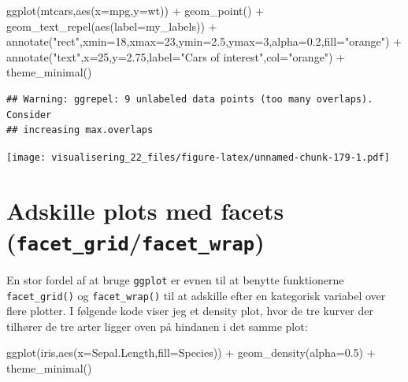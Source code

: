\documentclass[
]{book}
\newenvironment{Shaded}{\begin{snugshade}}{\end{snugshade}}
\newcommand{\AttributeTok}[1]{\textcolor[rgb]{0.77,0.63,0.00}{#1}}
\newcommand{\DecValTok}[1]{\textcolor[rgb]{0.00,0.00,0.81}{#1}}
\newcommand{\FloatTok}[1]{\textcolor[rgb]{0.00,0.00,0.81}{#1}}
\newcommand{\FunctionTok}[1]{\textcolor[rgb]{0.00,0.00,0.00}{#1}}
\newcommand{\NormalTok}[1]{#1}
\newcommand{\SpecialCharTok}[1]{\textcolor[rgb]{0.00,0.00,0.00}{#1}}
\newcommand{\StringTok}[1]{\textcolor[rgb]{0.31,0.60,0.02}{#1}}
\begin{document}
\begin{Shaded}
\begin{Highlighting}[]
\FunctionTok{ggplot}\NormalTok{(mtcars,}\FunctionTok{aes}\NormalTok{(}\AttributeTok{x=}\NormalTok{mpg,}\AttributeTok{y=}\NormalTok{wt)) }\SpecialCharTok{+} 
  \FunctionTok{geom\_point}\NormalTok{() }\SpecialCharTok{+}
  \FunctionTok{geom\_text\_repel}\NormalTok{(}\FunctionTok{aes}\NormalTok{(}\AttributeTok{label=}\NormalTok{my\_labels)) }\SpecialCharTok{+}
  \FunctionTok{annotate}\NormalTok{(}\StringTok{"rect"}\NormalTok{,}\AttributeTok{xmin=}\DecValTok{18}\NormalTok{,}\AttributeTok{xmax=}\DecValTok{23}\NormalTok{,}\AttributeTok{ymin=}\FloatTok{2.5}\NormalTok{,}\AttributeTok{ymax=}\DecValTok{3}\NormalTok{,}\AttributeTok{alpha=}\FloatTok{0.2}\NormalTok{,}\AttributeTok{fill=}\StringTok{"orange"}\NormalTok{) }\SpecialCharTok{+}
  \FunctionTok{annotate}\NormalTok{(}\StringTok{"text"}\NormalTok{,}\AttributeTok{x=}\DecValTok{25}\NormalTok{,}\AttributeTok{y=}\FloatTok{2.75}\NormalTok{,}\AttributeTok{label=}\StringTok{"Cars of interest"}\NormalTok{,}\AttributeTok{col=}\StringTok{"orange"}\NormalTok{) }\SpecialCharTok{+} 
  \FunctionTok{theme\_minimal}\NormalTok{()}
\end{Highlighting}
\end{Shaded}

\begin{verbatim}
## Warning: ggrepel: 9 unlabeled data points (too many overlaps). Consider
## increasing max.overlaps
\end{verbatim}

\texttt{[image: visualisering\_22\_files/figure-latex/unnamed-chunk-179-1.pdf]}

\hypertarget{adskille-plots-med-facets-facet_gridfacet_wrap}{%
\section{\texorpdfstring{Adskille plots med facets (\texttt{facet\_grid}/\texttt{facet\_wrap})}{Adskille plots med facets (facet\_grid/facet\_wrap)}}\label{adskille-plots-med-facets-facet_gridfacet_wrap}}

En stor fordel af at bruge \texttt{ggplot} er evnen til at benytte funktionerne \texttt{facet\_grid()} og \texttt{facet\_wrap()} til at adskille efter en kategorisk variabel over flere plotter. I følgende kode viser jeg et density plot, hvor de tre kurver der tilhører de tre arter ligger oven på hindanen i det samme plot:

\begin{Shaded}
\begin{Highlighting}[]
\FunctionTok{ggplot}\NormalTok{(iris,}\FunctionTok{aes}\NormalTok{(}\AttributeTok{x=}\NormalTok{Sepal.Length,}\AttributeTok{fill=}\NormalTok{Species)) }\SpecialCharTok{+} 
  \FunctionTok{geom\_density}\NormalTok{(}\AttributeTok{alpha=}\FloatTok{0.5}\NormalTok{) }\SpecialCharTok{+} 
  \FunctionTok{theme\_minimal}\NormalTok{()}
\end{Highlighting}
\end{Shaded}
\end{document}
